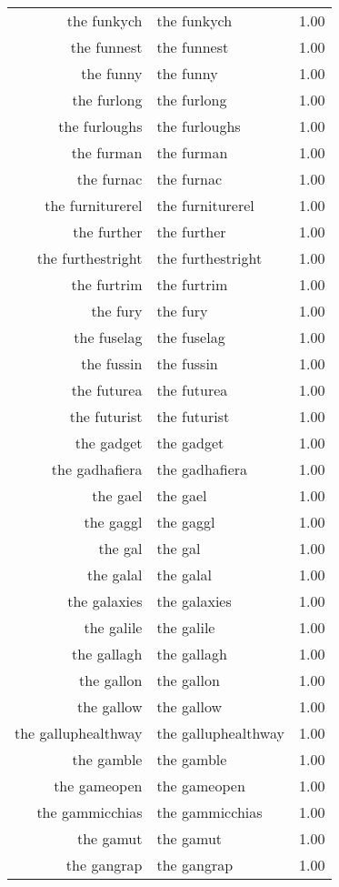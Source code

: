 \begin{table}[ht]
\begin{tabular}{rlr}
  the funkych & the funkych & 1.00 \\ 
  the funnest & the funnest & 1.00 \\ 
  the funny & the funny & 1.00 \\ 
  the furlong & the furlong & 1.00 \\ 
  the furloughs & the furloughs & 1.00 \\ 
  the furman & the furman & 1.00 \\ 
  the furnac & the furnac & 1.00 \\ 
  the furniturerel & the furniturerel & 1.00 \\ 
  the further & the further & 1.00 \\ 
  the furthestright & the furthestright & 1.00 \\ 
  the furtrim & the furtrim & 1.00 \\ 
  the fury & the fury & 1.00 \\ 
  the fuselag & the fuselag & 1.00 \\ 
  the fussin & the fussin & 1.00 \\ 
  the futurea & the futurea & 1.00 \\ 
  the futurist & the futurist & 1.00 \\ 
  the gadget & the gadget & 1.00 \\ 
  the gadhafiera & the gadhafiera & 1.00 \\ 
  the gael & the gael & 1.00 \\ 
  the gaggl & the gaggl & 1.00 \\ 
  the gal & the gal & 1.00 \\ 
  the galal & the galal & 1.00 \\ 
  the galaxies & the galaxies & 1.00 \\ 
  the galile & the galile & 1.00 \\ 
  the gallagh & the gallagh & 1.00 \\ 
  the gallon & the gallon & 1.00 \\ 
  the gallow & the gallow & 1.00 \\ 
  the galluphealthway & the galluphealthway & 1.00 \\ 
  the gamble & the gamble & 1.00 \\ 
  the gameopen & the gameopen & 1.00 \\ 
  the gammicchias & the gammicchias & 1.00 \\ 
  the gamut & the gamut & 1.00 \\ 
  the gangrap & the gangrap & 1.00 \\ 

\end{tabular}
\end{table}
